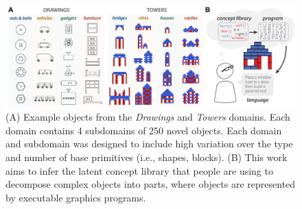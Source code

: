 


\begin{figure}[ht!]
  \begin{center}
  \includegraphics[width=1.02\linewidth]{figures/lax_task.pdf}
  \caption{(A) Example objects from the \textit{Drawings} and \textit{Towers} domains. Each domain contains 4 subdomains of 250 novel objects. Each domain and subdomain was designed to include high variation over the type and number of base primitives (i.e., shapes, blocks). (B) This work aims to infer the latent concept library that people are using to decompose complex objects into parts, where objects are represented by executable graphics programs.}
  \label{fig:task}
  \end{center}
 \end{figure}



